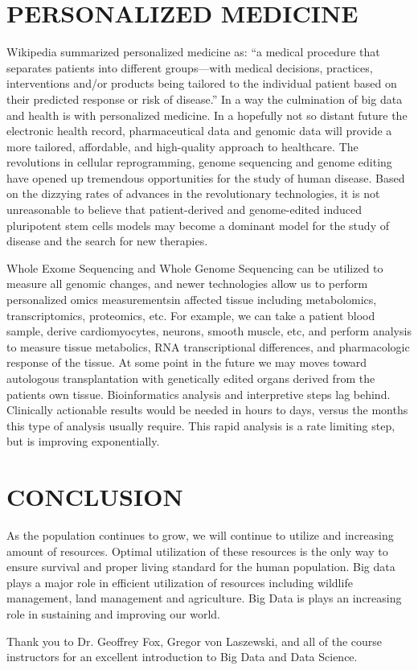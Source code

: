 \documentclass[sigconf]{acmart}
\begin{document}
\section{PERSONALIZED MEDICINE}

Wikipedia summarized personalized medicine as: ``a medical
procedure that separates patients into different groups—with medical
decisions, practices, interventions and/or products being tailored to
the individual patient based on their predicted response or risk of
disease.''  \cite{wiki-personalized} In a way the culmination of big
data and health is with personalized medicine.  In a hopefully not so
distant future the electronic health record, pharmaceutical data and
genomic data will provide a more tailored, affordable, and
high-quality approach to healthcare. 
The revolutions in cellular reprogramming, genome sequencing and genome editing have opened up tremendous opportunities for the study of human disease.  Based on the dizzying rates of advances in the  revolutionary technologies, it is not unreasonable to believe that patient-derived and genome-edited  induced pluripotent stem cells models may become a dominant model for the study of  disease and the search for new therapies.

Whole Exome Sequencing and Whole Genome Sequencing  can be utilized to measure all genomic changes, and newer technologies allow us to perform personalized omics measurementsin affected tissue including metabolomics, transcriptomics, proteomics, etc.  For example, we can take a patient blood sample, derive cardiomyocytes, neurons, smooth muscle, etc, and perform analysis to measure tissue metabolics, RNA transcriptional differences, and pharmacologic response of the tissue. At some point in the future we may moves toward autologous transplantation with genetically edited organs derived from the patients own tissue.   
Bioinformatics analysis and interpretive steps lag behind.  Clinically actionable results would be needed in hours to days, versus the months this type of analysis usually require.  This rapid analysis  is a rate limiting step, but is improving exponentially. 

\section{CONCLUSION}
As the population continues to grow, we will continue to utilize and increasing amount of resources.  Optimal utilization of these resources is the only way to ensure survival and proper living standard for the human population.  Big data plays a major role in efficient utilization of resources including wildlife management, land management and agriculture.  Big Data is plays an increasing role in sustaining and improving our world.  

\begin{acks}

Thank you to Dr. Geoffrey Fox, Gregor von Laszewski, and all of the
course instructors for an excellent introduction to Big Data and Data
Science.

\end{acks}



 
\end{document}
